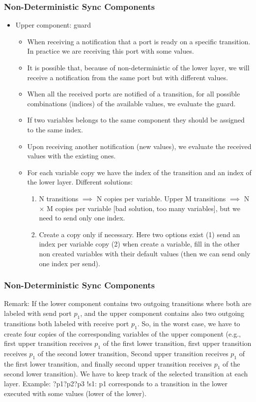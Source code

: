 \documentclass[compress,xcolor=dvipsnames,10pt]{beamer}
\begin{document}
\begin{frame}
 \frametitle{Non-Deterministic Sync Components}
 \begin{itemize}
  \item Upper component: guard
\begin{itemize}
 \item When receiving a notification that a port is ready on a specific transition. In practice we are receiving this port with some values.
 \item It is possible that, because of non-deterministic of the lower layer, we will receive a notification from the same port but with different values. 
 \item When all the received ports are notified of a transition, for all possible combinations (indices) of the available values, we evaluate the guard.
 \item If two variables belongs to the same component they should be assigned to the same index. 
 \item Upon receiving another notification (new values), we evaluate the received values with the existing ones. 
 \item For each variable copy we have the index of the transition and an index of the lower layer. Different solutions: 
 \begin{enumerate}
  \item N transitions $\implies$ N copies per variable. Upper M transitions $\implies$ N $\times$ M copies per variable [bad solution, too many variables], but we need to send only one index. 
  \item Create a copy only if necessary. Here two options exist (1) send an index per variable copy (2) when create a variable, fill in the other non created variables with their default values (then we can send only one index per send).  
 \end{enumerate}

\end{itemize}
 \end{itemize}
\end{frame}
\begin{frame}
 \frametitle{Non-Deterministic Sync Components}
 {\scriptsize
 Remark: If the lower component contains two outgoing transitions where both are labeled with send port $p_1$, and the upper component contains also two outgoing transitions both labeled with receive port $p_1$.
 So, in the worst case, we have to create four copies of the corresponding variables of the upper component (e.g., first upper transition receives $p_1$ of the first lower transition, first upper transition receives $p_1$ of the second lower transition, 
 Second upper transition receives $p_1$ of the first lower transition, and finally second upper transition receives $p_1$ of the second lower transition). We have to keep track of the selected transition at each layer. 
 Example:
 \scriptsize ?p1?p2?p3   !s1: p1 corresponds to a transition in the lower executed with some values (lower of the lower).
 }
\end{frame}
\end{document}
